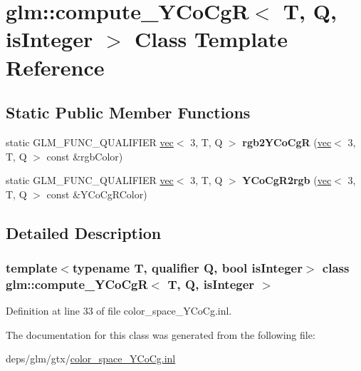 \hypertarget{classglm_1_1compute__YCoCgR}{}\section{glm\+:\+:compute\+\_\+\+Y\+Co\+CgR$<$ T, Q, is\+Integer $>$ Class Template Reference}
\label{classglm_1_1compute__YCoCgR}
\subsection*{Static Public Member Functions}
\begin{DoxyCompactItemize}
\item 
\mbox{\label{classglm_1_1compute__YCoCgR_a54c896f58edbb8d14d522358dde783a9}} 
static G\+L\+M\+\_\+\+F\+U\+N\+C\+\_\+\+Q\+U\+A\+L\+I\+F\+I\+ER \hyperlink{structglm_1_1vec}{vec}$<$ 3, T, Q $>$ {\bfseries rgb2\+Y\+Co\+CgR} (\hyperlink{structglm_1_1vec}{vec}$<$ 3, T, Q $>$ const \&rgb\+Color)
\item 
\mbox{\label{classglm_1_1compute__YCoCgR_a90eb0aada34098a657429dea2323e00a}} 
static G\+L\+M\+\_\+\+F\+U\+N\+C\+\_\+\+Q\+U\+A\+L\+I\+F\+I\+ER \hyperlink{structglm_1_1vec}{vec}$<$ 3, T, Q $>$ {\bfseries Y\+Co\+Cg\+R2rgb} (\hyperlink{structglm_1_1vec}{vec}$<$ 3, T, Q $>$ const \&Y\+Co\+Cg\+R\+Color)
\end{DoxyCompactItemize}


\subsection{Detailed Description}
\subsubsection*{template$<$typename T, qualifier Q, bool is\+Integer$>$\newline
class glm\+::compute\+\_\+\+Y\+Co\+Cg\+R$<$ T, Q, is\+Integer $>$}



Definition at line 33 of file color\+\_\+space\+\_\+\+Y\+Co\+Cg.\+inl.



The documentation for this class was generated from the following file\+:\begin{DoxyCompactItemize}
\item 
deps/glm/gtx/\hyperlink{color__space__YCoCg_8inl}{color\+\_\+space\+\_\+\+Y\+Co\+Cg.\+inl}\end{DoxyCompactItemize}
